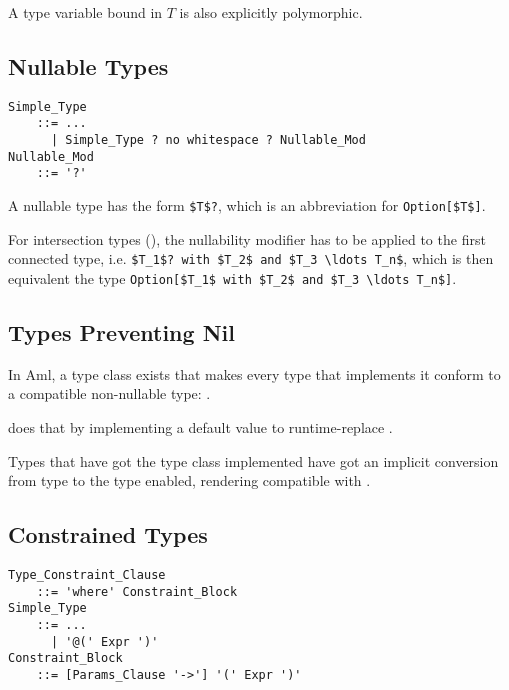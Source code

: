 A type variable bound in $T$ is also explicitly polymorphic. 





\subsection{Nullable Types}
\label{sec:nullable-types}

\grammar\begin{lstlisting}[deletekeywords={no}]
Simple_Type
    ::= ...
      | Simple_Type ? no whitespace ? Nullable_Mod
Nullable_Mod 
    ::= '?'
\end{lstlisting}

A nullable type has the form \lstinline!$T$?!, which is an abbreviation for \lstinline!Option[$T$]!.

For intersection types (), the nullability modifier has to be applied to the first connected type, i.e. \lstinline!$T_1$? with $T_2$ and $T_3 \ldots T_n$!, which is then equivalent the type \lstinline!Option[$T_1$ with $T_2$ and $T_3 \ldots T_n$]!. 





\subsection{Types Preventing Nil}
\label{sec:types-preventing-nil}

In Aml, a type class exists that makes every type that implements it conform to a compatible non-nullable type: . 

 does that by implementing a default value to runtime-replace . 

Types  that have got the  type class implemented have got an implicit conversion from type  to the type  enabled, rendering  compatible with .








\subsection{Constrained Types}
\label{sec:constrained-types}

\grammar\begin{lstlisting}
Type_Constraint_Clause 
    ::= 'where' Constraint_Block
Simple_Type
    ::= ...
      | '@(' Expr ')'
Constraint_Block 
    ::= [Params_Clause '->'] '(' Expr ')'
\end{lstlisting}

